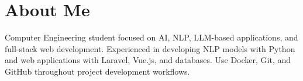 
\section{About Me}

Computer Engineering student focused on AI, NLP, LLM-based applications, and full-stack web development. Experienced in developing NLP models with Python and web applications with Laravel, Vue.js, and databases. Use Docker, Git, and GitHub throughout project development workflows.
